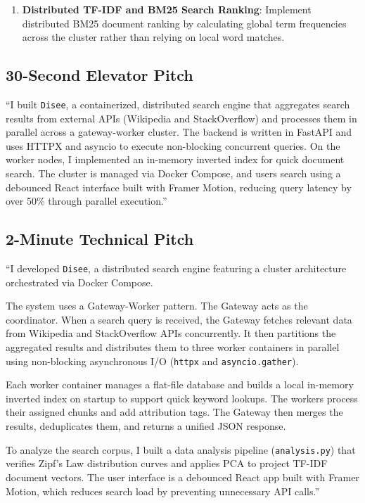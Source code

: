 \documentclass[11pt,a4paper]{article}
\begin{document}
\begin{itemize}
\begin{enumerate}
    \item \textbf{Distributed TF-IDF and BM25 Search Ranking}:
    Implement distributed BM25 document ranking by calculating global term frequencies across the cluster rather than relying on local word matches.
\end{enumerate}

\newpage

\subsection{30-Second Elevator Pitch}
``I built \texttt{Disee}, a containerized, distributed search engine that aggregates search results from external APIs (Wikipedia and StackOverflow) and processes them in parallel across a gateway-worker cluster. The backend is written in FastAPI and uses HTTPX and asyncio to execute non-blocking concurrent queries. On the worker nodes, I implemented an in-memory inverted index for quick document search. The cluster is managed via Docker Compose, and users search using a debounced React interface built with Framer Motion, reducing query latency by over 50\% through parallel execution.''

\subsection{2-Minute Technical Pitch}
``I developed \texttt{Disee}, a distributed search engine featuring a cluster architecture orchestrated via Docker Compose.

The system uses a Gateway-Worker pattern. The Gateway acts as the coordinator. When a search query is received, the Gateway fetches relevant data from Wikipedia and StackOverflow APIs concurrently. It then partitions the aggregated results and distributes them to three worker containers in parallel using non-blocking asynchronous I/O (\texttt{httpx} and \texttt{asyncio.gather}). 

Each worker container manages a flat-file database and builds a local in-memory inverted index on startup to support quick keyword lookups. The workers process their assigned chunks and add attribution tags. The Gateway then merges the results, deduplicates them, and returns a unified JSON response. 

To analyze the search corpus, I built a data analysis pipeline (\texttt{analysis.py}) that verifies Zipf's Law distribution curves and applies PCA to project TF-IDF document vectors. The user interface is a debounced React app built with Framer Motion, which reduces search load by preventing unnecessary API calls.''


\end{itemize}
\end{document}
